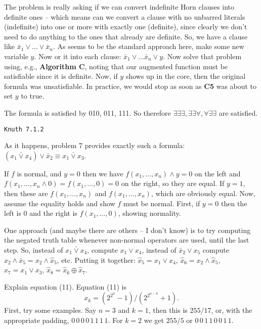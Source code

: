 \vskip 0.1in  The problem is really asking if we
can convert indefinite Horn clauses into definite ones -- which means can
we convert a clause with no unbarred literals (indefinite) into one or more with
exactly one (definite), since clearly we don't need to do anything to the
ones that already are definite.  So, we have a clause like $\bar x_1 \vee
\ldots \vee \bar x_n$.  As seems to be the standard approach here, make
some new variable $y$.  Now or it into each clause: $\bar x_1 \vee \ldots
\bar x_n \vee y$.  Now solve that problem using, e.g., {\bf Algorithm C},
noting that our augmented function must be satisfiable since it is definite.
Now, if $y$ shows up in the core, then the original formula was unsatisfiable.
In practice, we would stop as soon as {\bf C5} was about to set $y$ to true.

\vskip 0.1in  The formula is satisfied by 010, 011, 111.
So therefore $\exists \exists \exists, \exists \exists \forall, \forall \exists \exists$
are satisfied.

\topglue 0.5in
\centerline{\tt Knuth 7.1.2}
\vskip 0.3in

 As it happens, problem 7 provides exactly such
a formula: $\left(x_1 \bar \vee x_4\right) \vee \bar x_2 \equiv 
x_1 \bar \vee x_3$.

\vskip 0.1in  If $f$ is normal, and $y = 0$ then we
have $f\left(x_1, \ldots, x_n\right) \land y = 0$ on the left and
$f\left(x_1, \ldots, x_n \land 0\right) = f\left(x_1, \ldots, 0\right) = 0$
on the right, so they are equal.  If $y=1$, then these are 
$f\left(x_1, \ldots, x_n\right)$ and $f\left(x_1, \ldots, x_n\right)$, which
are obviously equal.  Now, assume the equality holds and show
$f$ must be normal.  First, if $y=0$ then the left is 0 and the right is
$f\left(x_1, \ldots, 0\right)$, showing normality. 

\vskip 0.1in  One approach (and maybe there
are others -- I don't know) is to try computing 
the negated truth table whenever non-normal operators are used, 
until the last step.  So, instead of $x_1 \bar \vee x_4$,
compute $x_1 \vee x_4$, instead of $\bar x_2 \vee x_5$ compute
$x_2 \land \bar x_5 = x_2 \land \hat x_5$, etc.  Putting it together:
$\hat x_5 = x_1 \vee x_4$, $\hat x_6 = x_2 \land \hat x_5$,
$\hat x_7 = x_1 \vee x_3$, $\hat x_8 = \hat x_6 \oplus \hat x_7$.

\vskip 0.1in  Explain equation (11).\hfil\break
Equation (11) is 
$$
 x_k = \left(2^{2^n} - 1\right) / \left(2^{2^{n-k}} + 1\right).
$$
First, try some examples.  Say $n = 3$ and $k=1$, then this is
$255 / 17$, or, with the appropriate padding, $0\,0\,0\,0\,1\,1\,1\,1$.
For $k=2$ we get $255 / 5$ or $0\,0\,1\,1\,0\,0\,1\,1$.

